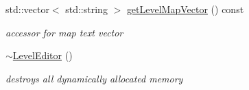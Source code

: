 \begin{DoxyCompactItemize}
std\+::vector$<$ std\+::string $>$ \hyperlink{class_level_editor_ae60797218578c738c78d56d33971f113}{get\+Level\+Map\+Vector} () const
\begin{DoxyCompactList}\small\item\em accessor for map text vector \end{DoxyCompactList}\item 
\hypertarget{class_level_editor_a2fdfaad257e235e2f392b08fabee79ec}{}\label{class_level_editor_a2fdfaad257e235e2f392b08fabee79ec} 
\hyperlink{class_level_editor_a2fdfaad257e235e2f392b08fabee79ec}{$\sim$\+Level\+Editor} ()
\begin{DoxyCompactList}\small\item\em destroys all dynamically allocated memory \end{DoxyCompactList}\end{DoxyCompactItemize}
